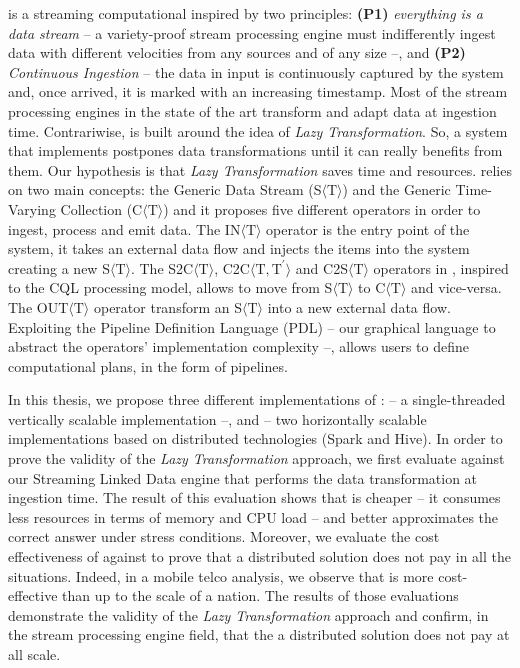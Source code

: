 \river{} is a streaming computational inspired by two principles: \textbf{(P1)} \textit{everything is a data stream} -- a variety-proof stream processing engine must indifferently ingest data with different velocities from any sources and of any size --, and \textbf{(P2)} \textit{Continuous Ingestion} -- the data in input is continuously captured by the system and, once arrived, it is marked with an increasing timestamp.
Most of the stream processing engines in the state of the art transform and adapt data at ingestion time.
Contrariwise, \river{} is built around the idea of \textit{Lazy Transformation}.
So, a system that implements \river{} postpones data transformations until it can really benefits from them.
Our hypothesis is that \textit{Lazy Transformation} saves time and resources.
\river{} relies on two main concepts: the Generic Data Stream (S$\langle\mathrm{T}\rangle$) and the Generic Time-Varying Collection (C$\langle\mathrm{T}\rangle$) and it proposes five different operators in order to ingest, process and emit data.
The IN$\langle\mathrm{T}\rangle$ operator is the entry point of the system, it takes an external data flow and injects the items into the system creating a new S$\langle\mathrm{T}\rangle$.
The S2C$\langle\mathrm{T}\rangle$, C2C$\langle\mathrm{T},\mathrm{T^{\prime}}\rangle$ and C2S$\langle\mathrm{T}\rangle$ operators in \river{}, inspired to the CQL processing model, allows to move from S$\langle\mathrm{T}\rangle$ to C$\langle\mathrm{T}\rangle$ and vice-versa.
The OUT$\langle\mathrm{T}\rangle$ operator transform an S$\langle\mathrm{T}\rangle$ into a new external data flow.
Exploiting the Pipeline Definition Language (PDL) -- our graphical language to abstract the operators' implementation complexity --, \river{} allows users to define computational plans, in the form of pipelines.

In this thesis, we propose three different implementations of \river{}: \sti{} -- a single-threaded vertically scalable implementation --, \sparkdi{} and \hivedi{} -- two horizontally scalable implementations based on distributed technologies (Spark and Hive).
In order to prove the validity of the \textit{Lazy Transformation} approach, we first evaluate \sti{} against our Streaming Linked Data engine that performs the data transformation at ingestion time. The result of this evaluation shows that \sti{} is cheaper -- it consumes less resources in terms of memory and CPU load -- and better approximates the correct answer under stress conditions.
Moreover, we evaluate the cost effectiveness of \sti{} against \sparkdi{} to prove that a distributed solution does not pay in all the situations.
Indeed, in a mobile telco analysis, we observe that \sti{} is more cost-effective than \sparkdi{} up to the scale of a nation.
The results of those evaluations demonstrate the validity of the \textit{Lazy Transformation} approach and confirm, in the stream processing engine field, that the a distributed solution does not pay at all scale.

